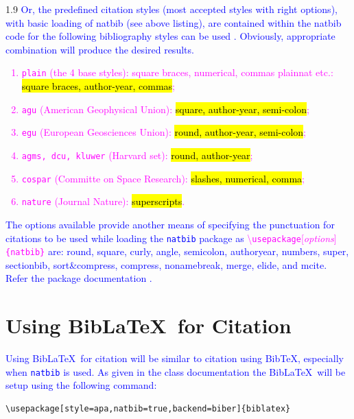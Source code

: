 \documentclass[phd]{ndsu-thesis-2022}
\newcommand\myspacing{1.9}      %
\newcommand\italk[1]{\textcolor{blue}{#1}}  %
\newcommand\cmd[1]{\textbackslash\texttt{#1}}  %
\newcommand\vb[1]{\textcolor{blue}{\texttt{#1}}}%
\begin{document}
\begin{spacing}{\myspacing}
\italk{Or, the predefined citation styles (most accepted styles with right options), with basic loading of natbib (see above listing), are contained within the natbib code for the following bibliography styles can be used \citep{daly2010natural}. Obviously, appropriate combination will produce the desired results.\\}

\vspace{-6ex}
\textcolor{magenta}{
\begin{enumerate}
\item \texttt{plain} (the 4 base styles): square braces, numerical, commas plainnat etc.: \hl{square braces, author-year, commas};
\item \texttt{agu} (American Geophysical Union): \hl{square, author-year, semi-colon};
\item \texttt{egu} (European Geosciences Union): \hl{round, author-year, semi-colon};
\item \texttt{agms, dcu, kluwer} (Harvard set): \hl{round, author-year};
\item \texttt{cospar} (Committe on Space Research): \hl{slashes, numerical, comma};
\item \texttt{nature} (Journal Nature): \hl{superscripts}.
\end{enumerate}
}

\italk{
The options available provide another means of specifying the punctuation
for citations to be used while loading the \texttt{natbib} package as \textcolor{magenta}{\cmd{usepackage}[\emph{options}]\texttt{\{natbib\}}} are: \textbullet\:round, \textbullet\:square, \textbullet\:curly, \textbullet\:angle, \textbullet\:semicolon, \textbullet\:authoryear, \textbullet\:numbers, \textbullet\:super, \textbullet\:sectionbib, \textbullet\:sort\&compress, \textbullet\:compress, \textbullet\:nonamebreak, \textbullet\:merge, \textbullet\:elide, and \textbullet\:mcite. Refer the package documentation \citep{daly2010natural}.  
}

\section{Using Bib\LaTeX\ for Citation}
\italk{Using Bib\LaTeX\ for citation will be similar to citation using BibTeX, especially when \vb{natbib} is used. As given in the class documentation the Bib\LaTeX\ will be setup using the following command:
}

\vspace{2ex}
{\singlespacing
\begin{verbatim}
\usepackage[style=apa,natbib=true,backend=biber]{biblatex}
\end{verbatim}
}


\end{spacing}
\end{document}
